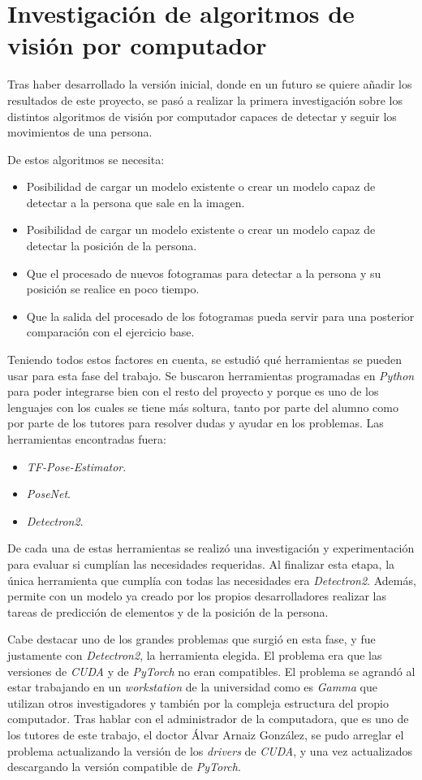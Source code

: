 {\section{Investigación de algoritmos de visión por computador} \label{aspc}
Tras haber desarrollado la versión inicial, donde en un futuro se quiere añadir los resultados de este proyecto, se pasó a realizar la primera investigación sobre los distintos algoritmos de visión por computador capaces de detectar y seguir los movimientos de una persona. 

De estos algoritmos se necesita:
\begin{itemize}
	\item Posibilidad de cargar un modelo existente o crear un modelo capaz de detectar a la persona que sale en la imagen.
	\item Posibilidad de cargar un modelo existente o crear un modelo capaz de detectar la posición de la persona.
	\item Que el procesado de nuevos fotogramas para detectar a la persona y su posición se realice en poco tiempo.
	\item Que la salida del procesado de los fotogramas pueda servir para una posterior comparación con el ejercicio base.
\end{itemize}

Teniendo todos estos factores en cuenta, se estudió qué herramientas se pueden usar para esta fase del trabajo. Se buscaron herramientas programadas en \textit{Python} para poder integrarse bien con el resto del proyecto y porque es uno de los lenguajes con los cuales se tiene más soltura, tanto por parte del alumno como por parte de los tutores para resolver dudas y ayudar en los problemas. Las herramientas encontradas fuera:
\begin{itemize}
	\item \textit{TF-Pose-Estimator}.
	\item \textit{PoseNet}.
	\item \textit{Detectron2}.
\end{itemize}

De cada una de estas herramientas se realizó una investigación y experimentación para evaluar si cumplían las necesidades requeridas. Al finalizar esta etapa, la única herramienta que cumplía con todas las necesidades era \textit{Detectron2}. Además, permite con un modelo ya creado por los propios desarrolladores realizar las tareas de predicción de elementos y de la posición de la persona.

Cabe destacar uno de los grandes problemas que surgió en esta fase, y fue justamente con \textit{Detectron2}, la herramienta elegida. El problema era que las versiones de \textit{CUDA} y de \textit{PyTorch} no eran compatibles. El problema se agrandó al estar trabajando en un \textit{workstation} de la universidad como es \textit{Gamma} que utilizan otros investigadores y también por la compleja estructura del propio computador. Tras hablar con el administrador de la computadora, que es uno de los tutores de este trabajo, el doctor Álvar Arnaiz González, se pudo arreglar el problema actualizando la versión de los \textit{drivers} de \textit{CUDA}, y una vez actualizados descargando la versión compatible de \textit{PyTorch}. 
}
